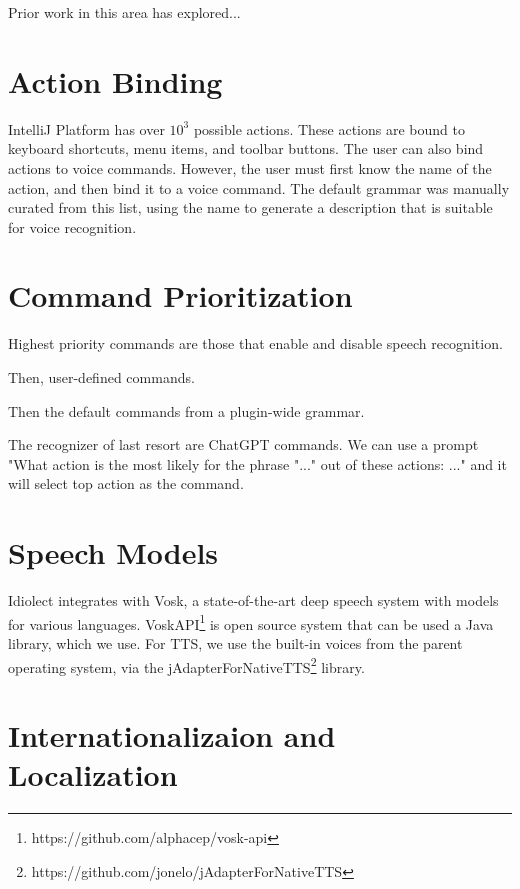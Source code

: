 \documentclass[conference]{IEEEtran}
\begin{document}
Prior work in this area has explored...

\section{Action Binding}

IntelliJ Platform has over $10^3$ possible actions. These actions are bound to keyboard shortcuts, menu items, and toolbar buttons. The user can also bind actions to voice commands. However, the user must first know the name of the action, and then bind it to a voice command. The default grammar was manually curated from this list, using the name to generate a description that is suitable for voice recognition.

\section{Command Prioritization}

Highest priority commands are those that enable and disable speech recognition.

Then, user-defined commands.

Then the default commands from a plugin-wide grammar.

The recognizer of last resort are ChatGPT commands. We can use a prompt "What action is the most likely for the phrase "..." out of these actions: ..." and it will select top action as the command.

\section{Speech Models}

Idiolect integrates with Vosk, a state-of-the-art deep speech system with models for various languages. VoskAPI\footnote{https://github.com/alphacep/vosk-api} is open source system that can be used a Java library, which we use. For TTS, we use the built-in voices from the parent operating system, via the jAdapterForNativeTTS\footnote{https://github.com/jonelo/jAdapterForNativeTTS} library.

\section{Internationalizaion and Localization}
\end{document}
